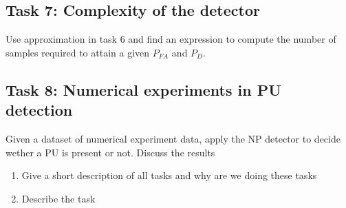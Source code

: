 \subsection{Task 7: Complexity of the detector}
Use approximation in task 6 and find an expression to compute the number of samples required to attain a given $P_{FA}$ and $P_D$.

\subsection{Task 8: Numerical experiments in PU detection}
Given a dataset of numerical experiment data, apply the NP detector to decide wether a PU is present or not. Discuss the results
\begin{enumerate}[i]
	\item Give a short description of all tasks and why are we doing these tasks
	\item Describe the task
\end{enumerate}